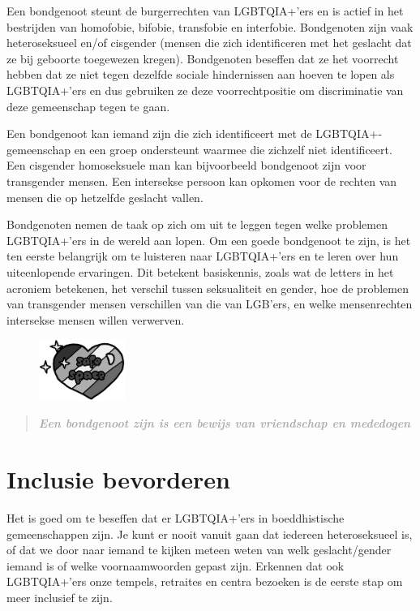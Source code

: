 \documentclass[12pt,openany]{book}
\begin{document}
Een  bondgenoot steunt de burgerrechten van LGBTQIA+'ers en is actief in het bestrijden van homofobie, bifobie, transfobie en interfobie. Bondgenoten zijn vaak heteroseksueel en/of cisgender (mensen die zich identificeren met het geslacht dat ze bij geboorte toegewezen kregen). Bondgenoten beseffen dat ze het voorrecht hebben dat ze niet tegen dezelfde sociale hindernissen aan hoeven te lopen als LGBTQIA+'ers en dus gebruiken ze deze voorrechtpositie om discriminatie van deze gemeenschap tegen te gaan. 

Een bondgenoot kan iemand zijn die zich identificeert met de LGBTQIA+-gemeenschap en een groep ondersteunt waarmee die zichzelf niet identificeert. Een cisgender homoseksuele man kan bijvoorbeeld bondgenoot zijn voor transgender mensen. Een intersekse persoon kan opkomen voor de rechten van mensen die op hetzelfde geslacht vallen.

Bondgenoten nemen de taak op zich om uit te leggen tegen welke problemen LGBTQIA+'ers in de wereld aan lopen. Om een goede bondgenoot te zijn, is het ten eerste belangrijk om te luisteren naar LGBTQIA+'ers en te leren over hun uiteenlopende ervaringen. Dit betekent basiskennis, zoals wat de letters in het acroniem betekenen, het verschil tussen seksualiteit en gender, hoe de problemen van transgender mensen verschillen van die van LGB'ers, en welke mensenrechten intersekse mensen willen verwerven.
\begin{figure}
    \centering
    \includegraphics[width=0.25\textwidth]{12bw.png}
\end{figure}

\begin{quote}
\textit{\large \textbf{\textcolor{darkgray}{Een bondgenoot zijn is een bewijs van vriendschap en mededogen}}}
\end{quote}

\section*{Inclusie bevorderen}

Het is goed om te beseffen dat er LGBTQIA+'ers in boeddhistische gemeenschappen zijn. Je kunt er nooit vanuit gaan dat iedereen heteroseksueel is, of dat we door naar iemand te kijken meteen weten van welk geslacht/gender iemand is of welke voornaamwoorden gepast zijn. Erkennen dat ook LGBTQIA+'ers onze tempels, retraites en centra bezoeken is de eerste stap om meer inclusief te zijn.
\end{document}
